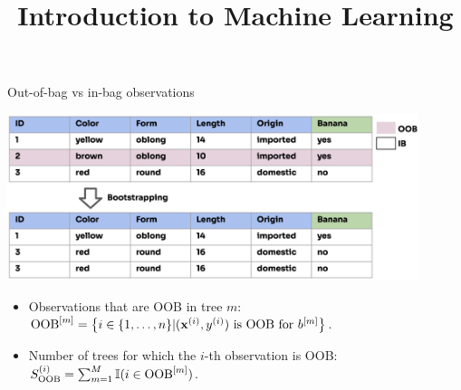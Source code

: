 \documentclass[11pt,compress,t,notes=noshow,xcolor=table]{beamer}
\title{Introduction to Machine Learning}
\begin{document}

\begin{vbframe}{Out-of-bag vs in-bag observations}
  
\begin{center}
\includegraphics[width=0.9\textwidth]{figure_man/forest-oob.png}
\end{center}

\begin{itemize}
  \item Observations that are OOB in tree $m$: $\text{OOB}^{[m]} = \left \{i \in \{1, \ldots, n\} | (\mathbf{x}^{(i)}, y^{(i)}) \text{ is OOB for } b^{[m]} \right \}$.
  \item Number of trees for which the $i$-th observation is OOB: $S_{\text{OOB}}^{(i)} = \sum_{m = 1}^M \mathbb{I}(i \in \text{OOB}^{[m]})$.
\end{itemize}

\end{vbframe}
\end{document}
